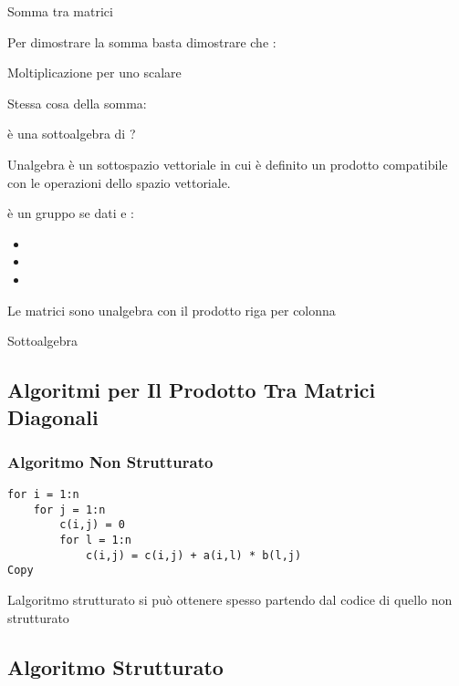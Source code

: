 \documentclass[
]{article}
\providecommand{\tightlist}{%
  \setlength{\itemsep}{0pt}\setlength{\parskip}{0pt}}
\begin{document}
{}

Somma tra matrici

Per dimostrare la somma basta dimostrare che {}:\\
{}

Moltiplicazione per uno scalare

Stessa cosa della somma:\\
{}

è una sottoalgebra di {}?

Un\textquotesingle algebra è un sottospazio vettoriale in cui è definito
un prodotto compatibile con le operazioni dello spazio vettoriale.

{} è un gruppo se dati {} e {}:

\begin{itemize}
\tightlist
\item
  {}
\item
  {}
\item
  {}
\end{itemize}

Le matrici {} sono un\textquotesingle algebra con il prodotto riga per
colonna

Sottoalgebra

{}{}{}

\hypertarget{algoritmi-per-il-prodotto-tra-matrici-diagonali}{%
\subsection{Algoritmi per Il Prodotto Tra Matrici
Diagonali}\label{algoritmi-per-il-prodotto-tra-matrici-diagonali}}

\hypertarget{algoritmo-non-strutturato}{%
\subsubsection{Algoritmo Non
Strutturato}\label{algoritmo-non-strutturato}}

\begin{verbatim}
for i = 1:n
    for j = 1:n
        c(i,j) = 0
        for l = 1:n
            c(i,j) = c(i,j) + a(i,l) * b(l,j)
Copy
\end{verbatim}

L\textquotesingle algoritmo strutturato si può ottenere spesso partendo
dal codice di quello non strutturato

\hypertarget{algoritmo-strutturato}{%
\subsection{Algoritmo Strutturato}\label{algoritmo-strutturato}}
\end{document}
